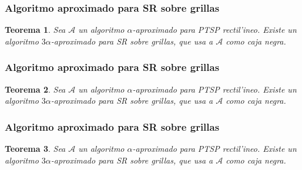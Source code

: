 \documentclass{beamer}
\newcommand{\probl}[1]{\textnormal{\textsf{#1}}}
\newtheorem*{thm}{Teorema}
\begin{document}
\begin{frame}
\frametitle{Algoritmo aproximado para \probl{SR} sobre grillas}

\begin{thm}
Sea $\mathcal{A}$ un algoritmo $\alpha$-aproximado para \probl{PTSP} rectil'ineo. Existe un algoritmo $3\alpha$-aproximado para \probl{SR} sobre grillas, que usa a $\mathcal{A}$ como caja negra.
\end{thm}

\vspace{3mm}

\begin{figure}
	\begin{center}
		
	\end{center}	
\end{figure}

\end{frame}

\begin{frame}
\frametitle{Algoritmo aproximado para \probl{SR} sobre grillas}

\begin{thm}
Sea $\mathcal{A}$ un algoritmo $\alpha$-aproximado para \probl{PTSP} rectil'ineo. Existe un algoritmo $3\alpha$-aproximado para \probl{SR} sobre grillas, que usa a $\mathcal{A}$ como caja negra.
\end{thm}

\vspace{3mm}

\begin{figure}
	\begin{center}
		
	\end{center}	
\end{figure}

\end{frame}

\begin{frame}
\frametitle{Algoritmo aproximado para \probl{SR} sobre grillas}

\begin{thm}
Sea $\mathcal{A}$ un algoritmo $\alpha$-aproximado para \probl{PTSP} rectil'ineo. Existe un algoritmo $3\alpha$-aproximado para \probl{SR} sobre grillas, que usa a $\mathcal{A}$ como caja negra.
\end{thm}

\vspace{3mm}

\begin{figure}
	\begin{center}
		
	\end{center}	
\end{figure}

\end{frame}
\end{document}

